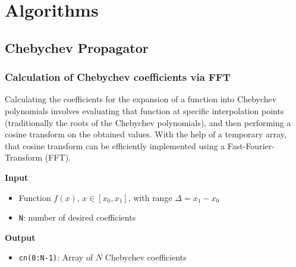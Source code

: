 \chapter{Algorithms}
\label{AppendixAlgos}

\section{Chebychev Propagator}

\subsection{Calculation of Chebychev coefficients via FFT}

Calculating the coefficients for the expansion of a function into Chebychev
polynomials involves evaluating that function at specific interpolation points
(traditionally the roots of the Chebychev polynomials),
and then performing a cosine transform on the obtained values. With the help of
a temporary array, that cosine transform can be efficiently implemented using a
Fast-Fourier-Transform (FFT).

\vspace{12pt}

{\bf Input}
\begin{itemize}
  \item Function $f(x)$, $x \in [x_0, x_1]$,
        with range $\Delta = x_1 - x_0$
  \item \verb|N|: number of desired coefficients
\end{itemize}


{\bf Output}
\begin{itemize}
  \item \verb|cn(0:N-1)|: Array of $N$  Chebychev coefficients
\end{itemize}


